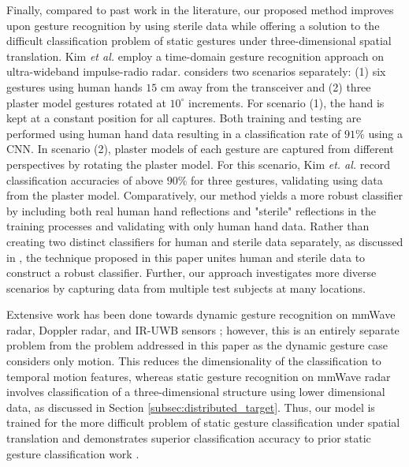 \documentclass{ieeeaccess}
\begin{document}
Finally, compared to past work in the literature, our proposed method improves upon gesture recognition by using sterile data while offering a solution to the difficult classification problem of static gestures under three-dimensional spatial translation. Kim \textit{et al.} \cite{static_gesture_recognition:time_domain} employ a time-domain gesture recognition approach on ultra-wideband impulse-radio radar. \cite{static_gesture_recognition:time_domain} considers two scenarios separately: (1) six gestures using human hands $15$ cm away from the transceiver and (2) three plaster model gestures rotated at $10^\circ$ increments. For scenario (1), the hand is kept at a constant position for all captures. Both training and testing are performed using human hand data resulting in a classification rate of $91\%$ using a CNN. In scenario (2), plaster models of each gesture are captured from different perspectives by rotating the plaster model. For this scenario, Kim \textit{et. al.} record classification accuracies of above $90\%$ for three gestures, validating using data from the plaster model. Comparatively, our method yields a more robust classifier by including both real human hand reflections and "sterile" reflections in the training processes and validating with only human hand data. Rather than creating two distinct classifiers for human and sterile data separately, as discussed in \cite{static_gesture_recognition:time_domain}, the technique proposed in this paper unites human and sterile data to construct a robust classifier. Further, our approach investigates more diverse scenarios by capturing data from multiple test subjects at many locations. 

Extensive work has been done towards dynamic gesture recognition on mmWave radar, Doppler radar, and IR-UWB sensors \cite{dynamic_gesture_recognition:application_of_Dopper_DCNN,dynamic_gesture_recognition:low_power,dynamic_gesture_recognition:LSTM,dynamic_gesture_recognition:micro_doppler,dynamic_gesture_recognition:svm,ir-uwb:digit_writing,ir-uwb:dynamic_gesture}; however, this is an entirely separate problem from the problem addressed in this paper as the dynamic gesture case considers only motion. This reduces the dimensionality of the classification to temporal motion features, whereas static gesture recognition on mmWave radar involves classification of a three-dimensional structure using lower dimensional data, as discussed in Section \ref{subsec:distributed_target}. Thus, our model is trained for the more difficult problem of static gesture classification under spatial translation and demonstrates superior classification accuracy to prior static gesture classification work \cite{static_gesture_recognition:time_domain}.
\end{document}
